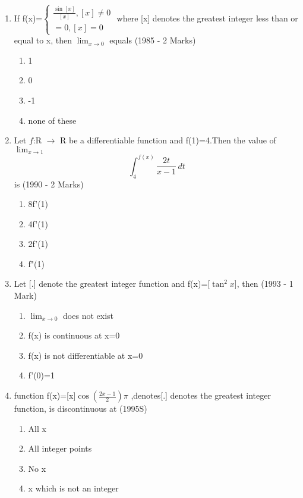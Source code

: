 \documentclass[journal,12pt,twocolumn]{IEEEtran}
\theoremstyle{remark}
\begin{document}
\begin{enumerate}[start=2]
\begin{enumerate}
                 \end{enumerate}

\item If f(x)=$\begin{cases}
    \frac{\sin[x]}{[x]}, [x]\neq 0\\ =0 ,  [x]=0\end{cases}$   where [x] denotes the greatest integer less than or equal to x, then $\lim_{x\to 0}$ equals
    \hfill                (1985 - 2 Marks)
    \begin{enumerate}
        \item 1
        \item 0
        \item -1
        \item none of these
    \end{enumerate}

\item Let $f$:R $\to$ R be a differentiable function and f(1)=4.Then the value of $\lim_{x\to 1}$\[ \int_{4}^{f(x)}\frac{2t}{x-1}\,dt\]  is
\hfill(1990 - 2 Marks)
 \begin{enumerate}
     \item 8f'(1)
     \item 4f'(1)
     \item 2f'(1)
     \item f"(1)
     
     
 \end{enumerate}

\item Let [.] denote the greatest integer function and f(x)=[$\tan^2{x}$], then
\hfill(1993 - 1 Mark)
    \begin{enumerate}
        \item $\lim_{x\to 0}$ does not exist
        \item f(x) is continuous at x=0
        \item f(x) is not differentiable at x=0
        \item f'(0)=1
        
    \end{enumerate}

\item  function f(x)=[x]$\cos{(\frac{2x-1}{2})}\pi$ ,denotes[.] denotes the greatest integer function, is discontinuous at
\hfill(1995S)
   \begin{enumerate}
       \item All x
       \item All integer points
       \item No x
       \item x which is not an integer
   \end{enumerate}


\end{enumerate}
\end{document}
